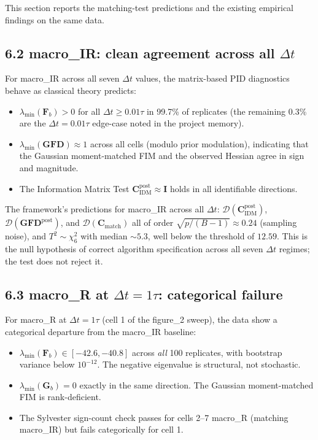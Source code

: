 \documentclass[11pt]{article}
\begin{document}
This section reports the matching-test predictions and the existing
empirical findings on the same data.

\subsection*{6.2 macro\_IR: clean agreement across all $\Delta t$}

For macro\_IR across all seven $\Delta t$ values, the matrix-based PID
diagnostics behave as classical theory predicts:

\begin{itemize}
\item $\lambda_{\min}(\mathbf F_b) > 0$ for all $\Delta t \geq 0.01\tau$
  in 99.7\% of replicates (the remaining 0.3\% are the
  $\Delta t = 0.01\tau$ edge-case noted in the project memory).
\item $\lambda_{\min}(\mathbf{GFD}) \approx 1$ across all cells (modulo
  prior modulation), indicating that the Gaussian moment-matched FIM
  and the observed Hessian agree in sign and magnitude.
\item The Information Matrix Test
  $\mathbf C_{\mathrm{IDM}}^{\mathrm{post}} \approx \mathbf I$ holds in all
  identifiable directions.
\end{itemize}

The framework's predictions for macro\_IR across all $\Delta t$:
$\mathcal D(\mathbf C_{\mathrm{IDM}}^{\mathrm{post}})$,
$\mathcal D(\mathbf{GFD}^{\mathrm{post}})$, and
$\mathcal D(\mathbf C_{\mathrm{match}})$ all of order
$\sqrt{p/(B-1)} \approx 0.24$ (sampling noise), and $T^2 \sim \chi^2_6$
with median $\sim 5.3$, well below the threshold of $12.59$. This is
the null hypothesis of correct algorithm specification across all
seven $\Delta t$ regimes; the test does not reject it.

\subsection*{6.3 macro\_R at $\Delta t = 1\tau$: categorical failure}

For macro\_R at $\Delta t = 1\tau$ (cell 1 of the figure\_2 sweep), the
data show a categorical departure from the macro\_IR baseline:

\begin{itemize}
\item $\lambda_{\min}(\mathbf F_b) \in [-42.6, -40.8]$ across
  \emph{all} 100 replicates, with bootstrap variance below $10^{-12}$.
  The negative eigenvalue is structural, not stochastic.
\item $\lambda_{\min}(\mathbf G_b) = 0$ exactly in the same
  direction. The Gaussian moment-matched FIM is rank-deficient.
\item The Sylvester sign-count check passes for cells 2--7 macro\_R
  (matching macro\_IR) but fails categorically for cell 1.
\end{itemize}
\end{document}

